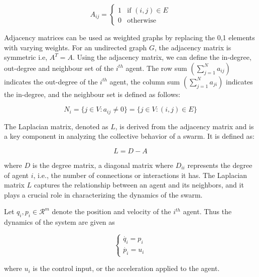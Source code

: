 \documentclass[letterpaper, 10 pt, conference]{ieeeconf}  %
\begin{document}
\[
A_{ij} =
\begin{cases}
    1 & \text{if } (i,j) \in E \\
    0 & \text{otherwise } 
\end{cases}
\]

Adjacency matrices can be used as weighted graphs by replacing the 0,1 elements with varying weights. For an undirected graph $G$, the adjacency matrix is symmetric i.e, $A^T = A$. Using the adjacency matrix, we can define the in-degree, out-degree and neighbour set of the $i^{th}$ agent. The row sum $(\sum_{j=1}^N a_{ij})$ indicates the out-degree of the $i^{th}$ agent, the column sum $(\sum_{j=1}^N a_{ji})$ indicates the in-degree, and the neighbour set is defined as follows: 

\begin{equation}
    N_i = \{j \in V:a_{ij} \neq 0 \} = \{j \in V:(i,j) \in E \}
\end{equation}

The Laplacian matrix, denoted as \(L\), is derived from the adjacency matrix and is a key component in analyzing the collective behavior of a swarm. It is defined as:

\[
L = D - A
\]

where \(D\) is the degree matrix, a diagonal matrix where \(D_{ii}\) represents the degree of agent \(i\), i.e., the number of connections or interactions it has. The Laplacian matrix \(L\) captures the relationship between an agent and its neighbors, and it plays a crucial role in characterizing the dynamics of the swarm.



Let $q_i, p_i \in \mathcal{R}^m$ denote the position and velocity of the $i^{th}$ agent. Thus the dynamics of the system are given as 

\[
\begin{cases}
  \dot{q_i} = p_i \\
  \dot{p_i} = u_i
\end{cases}
\]

where $u_i$ is the control input, or the acceleration applied to the agent. 
\end{document}

